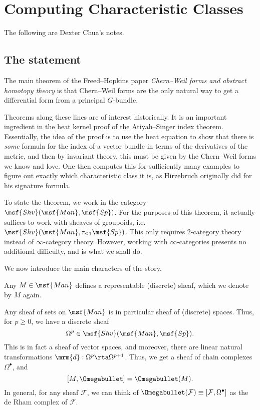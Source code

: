 
\section{Computing Characteristic Classes}
The following are Dexter Chua's notes.
\subsection{The statement}\label{section:statement}
The main theorem of the Freed--Hopkins paper \emph{Chern--Weil forms and abstract homotopy theory} is that Chern--Weil forms are the only natural way to get a differential form from a principal $G$-bundle.

Theorems along these lines are of interest historically. It is an important ingredient in the heat kernel proof of the Atiyah--Singer index theorem. Essentially, the idea of the proof is to use the heat equation to show that there is \emph{some} formula for the index of a vector bundle in terms of the derivatives of the metric, and then by invariant theory, this must be given by the Chern--Weil forms we know and love. One then computes this for sufficiently many examples to figure out exactly which characteristic class it is, as Hirzebruch originally did for his signature formula.

To state the theorem, we work in the category $\msf{Shv}(\msf{Man}, \msf{Sp})$. For the purposes of this theorem, it actually suffices to work with sheaves of groupoids, i.e.\ $\msf{Shv}(\msf{Man}, \tau_{\leq 1} \msf{Sp})$. This only requires $2$-category theory instead of $\infty$-category theory. However, working with $\infty$-categories presents no additional difficulty, and is what we shall do.

We now introduce the main characters of the story.
\begin{ex}
  Any $M \in \msf{Man}$ defines a representable (discrete) sheaf, which we denote by $M$ again.
\end{ex}

\begin{ex}
  Any sheaf of sets on $\msf{Man}$ is in particular sheaf of (discrete) spaces. Thus, for $p \geq 0$, we have a discrete sheaf
  \[
    \Omega^p \in \msf{Shv}(\msf{Man}, \msf{Sp}).
  \]
  This is in fact a sheaf of vector spaces, and moreover, there are linear natural transformations $\mrm{d}: \Omega^p \rta \Omega^{p + 1}$. Thus, we get a sheaf of chain complexes $\Omega^{\bullet}$, and
  \[
    [M, \Omegabullet] = \Omegabullet(M).
  \]
  In general, for any sheaf $\mathcal{F}$, we can think of $\Omegabullet (\mathcal{F}) \equiv [\mathcal{F}, \Omega^{\bullet}]$ as the de Rham complex of $\mathcal{F}$.
\end{ex}

